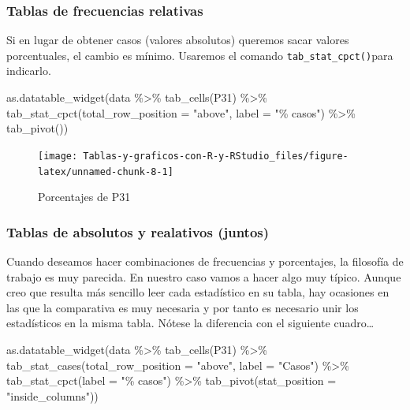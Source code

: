 \documentclass[
]{book}
\newenvironment{Shaded}{\begin{snugshade}}{\end{snugshade}}
\newcommand{\AttributeTok}[1]{\textcolor[rgb]{0.77,0.63,0.00}{#1}}
\newcommand{\FunctionTok}[1]{\textcolor[rgb]{0.00,0.00,0.00}{#1}}
\newcommand{\NormalTok}[1]{#1}
\newcommand{\SpecialCharTok}[1]{\textcolor[rgb]{0.00,0.00,0.00}{#1}}
\newcommand{\StringTok}[1]{\textcolor[rgb]{0.31,0.60,0.02}{#1}}
\begin{document}
\hypertarget{tablas-de-frecuencias-relativas}{%
\subsubsection{Tablas de frecuencias relativas}\label{tablas-de-frecuencias-relativas}}

Si en lugar de obtener casos (valores absolutos) queremos sacar valores porcentuales, el cambio es mínimo. Usaremos el comando \texttt{tab\_stat\_cpct()}para indicarlo.

\begin{Shaded}
\begin{Highlighting}[]
\FunctionTok{as.datatable\_widget}\NormalTok{(data }\SpecialCharTok{\%\textgreater{}\%}
  \FunctionTok{tab\_cells}\NormalTok{(P31) }\SpecialCharTok{\%\textgreater{}\%}
  \FunctionTok{tab\_stat\_cpct}\NormalTok{(}\AttributeTok{total\_row\_position =} \StringTok{"above"}\NormalTok{, }\AttributeTok{label =} \StringTok{"\% casos"}\NormalTok{) }\SpecialCharTok{\%\textgreater{}\%}
  \FunctionTok{tab\_pivot}\NormalTok{())}
\end{Highlighting}
\end{Shaded}

\begin{figure}[H]

{\centering \texttt{[image: Tablas-y-graficos-con-R-y-RStudio\_files/figure-latex/unnamed-chunk-8-1]} 

}

\caption{Porcentajes de P31}\label{fig:unnamed-chunk-8}
\end{figure}

\hypertarget{tablas-de-absolutos-y-realativos-juntos}{%
\subsubsection{Tablas de absolutos y realativos (juntos)}\label{tablas-de-absolutos-y-realativos-juntos}}

Cuando deseamos hacer combinaciones de frecuencias y porcentajes, la filosofía de trabajo es muy parecida. En nuestro caso vamos a hacer algo muy típico. Aunque creo que resulta más sencillo leer cada estadístico en su tabla, hay ocasiones en las que la comparativa es muy necesaria y por tanto es necesario unir los estadísticos en la misma tabla. Nótese la diferencia con el siguiente cuadro\ldots{}

\begin{Shaded}
\begin{Highlighting}[]
\FunctionTok{as.datatable\_widget}\NormalTok{(data }\SpecialCharTok{\%\textgreater{}\%}
  \FunctionTok{tab\_cells}\NormalTok{(P31) }\SpecialCharTok{\%\textgreater{}\%}
  \FunctionTok{tab\_stat\_cases}\NormalTok{(}\AttributeTok{total\_row\_position =} \StringTok{"above"}\NormalTok{, }\AttributeTok{label =} \StringTok{"Casos"}\NormalTok{) }\SpecialCharTok{\%\textgreater{}\%}
  \FunctionTok{tab\_stat\_cpct}\NormalTok{(}\AttributeTok{label =} \StringTok{"\% casos"}\NormalTok{) }\SpecialCharTok{\%\textgreater{}\%}
  \FunctionTok{tab\_pivot}\NormalTok{(}\AttributeTok{stat\_position =} \StringTok{"inside\_columns"}\NormalTok{))}
\end{Highlighting}
\end{Shaded}
\end{document}
